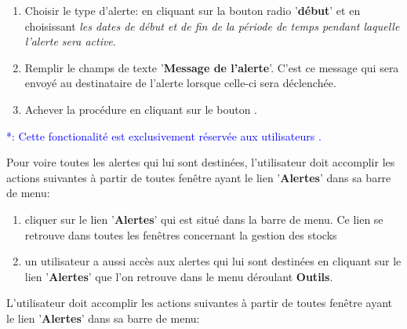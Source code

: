 \begin{enumerate}[1)]
		Le nom complet du destinataire est affich\'e automatiquement
		dans le champs de texte '\textbf{nom du destinataire}',
		qui est situ\'e juste \`a droite du champs de texte
		'\textbf{ID du destinataire}'.
		
	\item Choisir le type d'alerte:	
		en cliquant sur la bouton radio '\textbf{d\'ebut}' et 
		en choisissant \emph{les dates de d\'ebut et de fin de
		la p\'eriode de temps pendant laquelle l'alerte sera active}.
		
	\item Remplir le champs de texte '\textbf{Message de l'alerte}'.
		C'est ce message qui sera envoy\'e au destinataire de
		l'alerte lorsque celle-ci sera d\'eclench\'ee.	
		
	\item Achever la proc\'edure en cliquant sur le bouton .
\end{enumerate}


\newpage
{}\label{sec:voire-toutes-alertes}

\textcolor{blue}{*: Cette fonctionalit\'e est exclusivement
	r\'eserv\'ee aux utilisateurs \manager.}

Pour voire toutes les alertes qui lui sont destin\'ees, l'utilisateur
doit accomplir les actions suivantes \`a partir de toutes fen\^etre
ayant le lien '\textbf{Alertes}' dans sa barre de menu:
\begin{enumerate}[1)]
	\item cliquer sur le lien '\textbf{Alertes}' qui est situ\'e
	dans la barre de menu. Ce lien se retrouve dans toutes les
	fen\^etres concernant la gestion des stocks
	
	\item un utilisateur a aussi acc\`es aux alertes qui lui sont destin\'ees en cliquant sur le lien '\textbf{Alertes}' que
	l'on retrouve dans le menu d\'eroulant \textbf{Outils}.
\end{enumerate}


\label{sec:voire-details-alerte}

L'utilisateur doit accomplir les actions suivantes \`a
partir de toutes fen\^etre ayant le lien '\textbf{Alertes}'
dans sa barre de menu:

